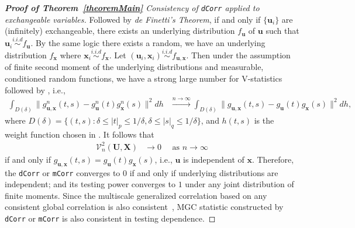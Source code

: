 \documentclass[11pt]{article}
\theoremstyle{definition}
\begin{document}
\begin{proof}[\textbf{Proof of Theorem~\ref{theoremMain}} Consistency of \texttt{dCorr} applied to exchangeable variables]
Followed by \textit{de Finetti's Theorem}, if and only if $\{ \mathbf{u}_{i} \}$ are (infinitely) exchangeable, there exists an underlying distribution $f_{\mathbf{u}}$ of $\mathbf{u}$ such that $\mathbf{u}_{i}  \overset{i.i.d}{\sim} f_{\mathbf{u}} $. By the same logic there exists a random, we have an underlying distribution $f_{\mathbf{x}}$ where $\mathbf{x}_{i} \overset{i.i.d}{\sim} f_{\mathbf{x}}$. Let $(\mathbf{u}_{i}, \mathbf{x}_{i}) \overset{i.i.d}{\sim}   f_{\mathbf{u}, \mathbf{x}}$. Then under the assumption of finite second moment of the underlying distributions and measurable, conditioned random functions, we have a strong large number for V-statistics followed by \cite{szekely2007measuring}, i.e., 
\begin{eqnarray}
\displaystyle\int_{D(\delta)}{\|g_{\mathbf{u},\mathbf{x}}^{n}(t,s)-g_{\mathbf{u}}^{n}(t)g_{\mathbf{x}}^{n}(s)\|^{2}}dh &\stackrel{n \rightarrow \infty}{\longrightarrow} 
\displaystyle\int_{D(\delta)}{\|g_{\mathbf{u},\mathbf{x}}(t,s)-g_{\mathbf{u}}(t)g_{\mathbf{x}}(s)\|^{2}}dh,
\label{eq:SLLN}
\end{eqnarray}
where $D(\delta)=\{(t,s):\delta \leq |t|_{p} \leq 1/\delta,\delta \leq |s|_{q} \leq 1/\delta\}$, and $h(t,s)$ is the weight function chosen in \cite{szekely2007measuring}. 	
It follows that 
\begin{eqnarray}
\mathcal{V}_{n}^{2}(\mathbf{U},\mathbf{X}) &\rightarrow 0 \quad \mbox{ as } n \rightarrow \infty
\label{eq:conv2}
\end{eqnarray}
if and only if $g_{\mathbf{u},\mathbf{x}}(t,s) = g_{\mathbf{u}}(t) g_{\mathbf{x}}(s)$, i.e., $\mathbf{u}$ is independent of $\mathbf{x}$. Therefore, the \texttt{dCorr} or \texttt{mCorr} converges to $0$ if and only if  underlying distributions are independent; and its testing power converges to $1$ under any joint distribution of finite moments. Since the multiscale generalized correlation based on any consistent global correlation is also consistent~\cite{shen2016discovering}, MGC statistic constructed by \texttt{dCorr} or \texttt{mCorr} is also consistent in testing dependence.
\end{proof}
	
\end{document}
